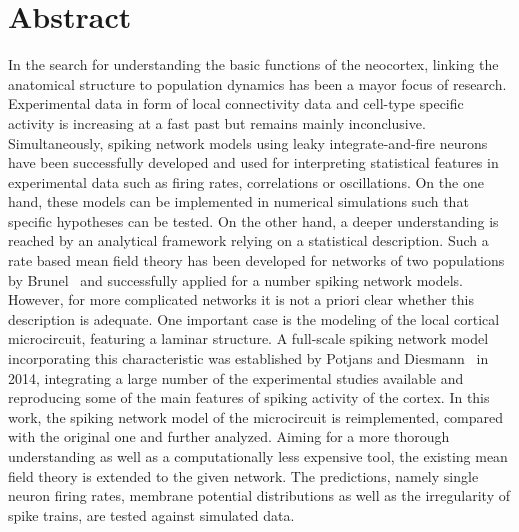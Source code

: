 \section{Abstract}
\label{abstract}
In the search for understanding the basic functions of the neocortex, 
linking the anatomical structure to population dynamics has been a mayor
focus of research. Experimental data in form of local connectivity data
and cell-type specific activity is increasing at a fast past but remains
mainly inconclusive. Simultaneously, spiking network models using 
leaky integrate-and-fire neurons 
have been successfully developed and used for interpreting 
statistical features in experimental data such as firing rates, 
correlations or oscillations. 
On the one hand, these models can be implemented in numerical 
simulations such that specific hypotheses can be tested. 
On the other hand, a deeper understanding is reached by 
an analytical framework relying on a statistical description.
Such a rate based mean field theory has been developed 
for networks of two populations
by Brunel~\cite{brunel2000} and successfully applied for a number 
spiking network models. However, for more complicated networks
it is not a priori clear whether this description is adequate. 
One important case is the modeling of the local cortical 
microcircuit, featuring a laminar structure. 
A full-scale spiking network model incorporating this characteristic
was established by Potjans and Diesmann~\cite{potjans2014} in 2014, 
integrating a large number of the experimental studies available and reproducing
some of the main features of spiking activity of the cortex.
In this work, the spiking network model of the microcircuit is reimplemented, 
compared with the original one and further analyzed.
Aiming for a more thorough understanding as well as a computationally less
expensive tool, the existing mean field theory is extended to the given network. 
The predictions, namely single neuron firing rates, 
membrane potential distributions as well as the irregularity of spike trains, 
are tested against simulated data. 
